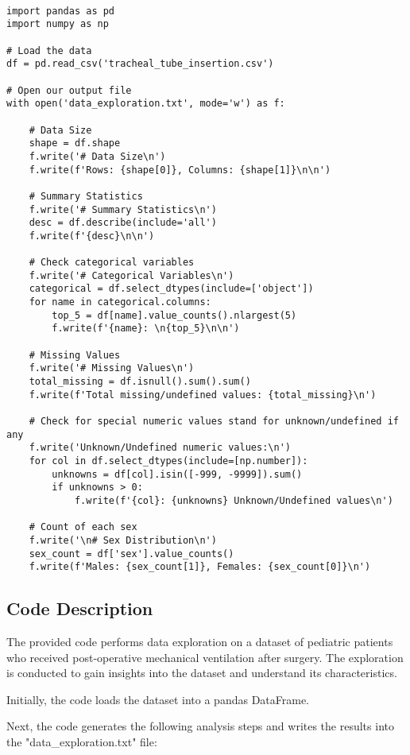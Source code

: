 \documentclass[11pt]{article}
\begin{document}
\begin{verbatim}

import pandas as pd
import numpy as np

# Load the data
df = pd.read_csv('tracheal_tube_insertion.csv')

# Open our output file
with open('data_exploration.txt', mode='w') as f:

    # Data Size
    shape = df.shape
    f.write('# Data Size\n')
    f.write(f'Rows: {shape[0]}, Columns: {shape[1]}\n\n')
    
    # Summary Statistics
    f.write('# Summary Statistics\n')
    desc = df.describe(include='all')
    f.write(f'{desc}\n\n')
    
    # Check categorical variables
    f.write('# Categorical Variables\n')
    categorical = df.select_dtypes(include=['object'])
    for name in categorical.columns:
        top_5 = df[name].value_counts().nlargest(5)
        f.write(f'{name}: \n{top_5}\n\n')
    
    # Missing Values
    f.write('# Missing Values\n')
    total_missing = df.isnull().sum().sum()
    f.write(f'Total missing/undefined values: {total_missing}\n')
    
    # Check for special numeric values stand for unknown/undefined if any
    f.write('Unknown/Undefined numeric values:\n')
    for col in df.select_dtypes(include=[np.number]):
        unknowns = df[col].isin([-999, -9999]).sum()
        if unknowns > 0:
            f.write(f'{col}: {unknowns} Unknown/Undefined values\n')
    
    # Count of each sex
    f.write('\n# Sex Distribution\n')
    sex_count = df['sex'].value_counts()
    f.write(f'Males: {sex_count[1]}, Females: {sex_count[0]}\n')

\end{verbatim}

\subsection{Code Description}

The provided code performs data exploration on a dataset of pediatric patients who received post-operative mechanical ventilation after surgery. The exploration is conducted to gain insights into the dataset and understand its characteristics. 

Initially, the code loads the dataset into a pandas DataFrame. 

Next, the code generates the following analysis steps and writes the results into the "data\_exploration.txt" file:
\end{document}
